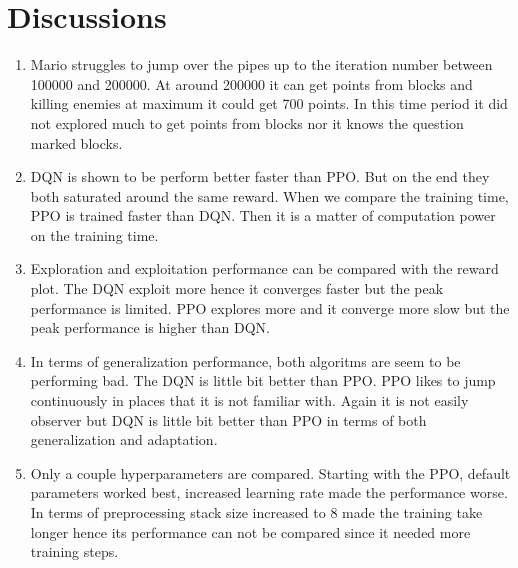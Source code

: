 \documentclass[3p,times,procedia]{elsarticle}
\begin{document}
\section{\textbf{Discussions}}
\vspace{3em}
\begin{enumerate}
    \item Mario struggles to jump over the pipes up to the iteration number between 100000 and 200000. At around 200000 it can get points from blocks and killing enemies at maximum it could get 700 points. In this time period it did not explored much to get points from blocks nor it knows the question marked blocks. 
    \\
    \item DQN is shown to be perform better faster than PPO. But on the end they both saturated around the same reward. When we compare the training time, PPO is trained faster than DQN. Then it is a matter of computation power on the training time.
    \\
    \item Exploration and exploitation performance can be compared with the reward plot. The DQN exploit more hence it converges faster but the peak performance is limited. PPO explores more and it converge more slow but the peak performance is higher than DQN.
    \\
    \item In terms of generalization performance, both algoritms are seem to be performing bad. The DQN is little bit better than PPO. PPO likes to jump continuously in places that it is not familiar with. Again it is not easily observer but DQN is little bit better than PPO in terms of both generalization and adaptation.
    \\
    \item Only a couple hyperparameters are compared.
    Starting with the PPO, default parameters worked best, increased learning rate made the performance worse. 
    In terms of preprocessing stack size increased to 8 made the training take longer hence its performance can not be compared since it needed more training steps.
    \\


\end{enumerate}
\end{document}
